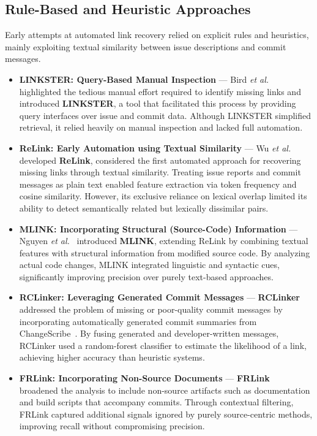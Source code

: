 \subsection{Rule-Based and Heuristic Approaches}
Early attempts at automated link recovery relied on explicit rules and heuristics, mainly exploiting textual similarity between issue descriptions and commit messages.
\begin{itemize}
    \item \textbf{LINKSTER: Query-Based Manual Inspection} --- Bird \textit{et al.}~\cite{linkster} highlighted the tedious manual effort required to identify missing links and introduced \textbf{LINKSTER}, a tool that facilitated this process by providing query interfaces over issue and commit data. Although LINKSTER simplified retrieval, it relied heavily on manual inspection and lacked full automation.
    \item \textbf{ReLink: Early Automation using Textual Similarity} --- Wu \textit{et al.}~\cite{relink} developed \textbf{ReLink}, considered the first automated approach for recovering missing links through textual similarity. Treating issue reports and commit messages as plain text enabled feature extraction via token frequency and cosine similarity. However, its exclusive reliance on lexical overlap limited its ability to detect semantically related but lexically dissimilar pairs.
    \item \textbf{MLINK: Incorporating Structural (Source-Code) Information} --- Nguyen \textit{et al.}~\cite{mlink} introduced \textbf{MLINK}, extending ReLink by combining textual features with structural information from modified source code. By analyzing actual code changes, MLINK integrated linguistic and syntactic cues, significantly improving precision over purely text-based approaches.
    \item \textbf{RCLinker: Leveraging Generated Commit Messages} --- \textbf{RCLinker}~\cite{q3} addressed the problem of missing or poor-quality commit messages by incorporating automatically generated commit summaries from ChangeScribe~\cite{r27,r28}. By fusing generated and developer-written messages, RCLinker used a random-forest classifier to estimate the likelihood of a link, achieving higher accuracy than heuristic systems.
    \item \textbf{FRLink: Incorporating Non-Source Documents} --- \textbf{FRLink}~\cite{r56} broadened the analysis to include non-source artifacts such as documentation and build scripts that accompany commits. Through contextual filtering, FRLink captured additional signals ignored by purely source-centric methods, improving recall without compromising precision.

\end{itemize}
